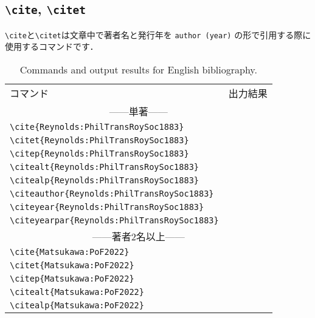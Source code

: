 \documentclass[a4paper,fleqn,12pt,uplatex]{jsarticle}
\begin{document}
\subsection*{\texttt{\textbackslash{}cite}, \texttt{\textbackslash{}citet}}
\verb|\cite|と\verb|\citet|は文章中で著者名と発行年を \verb|author (year)| の形で引用する際に使用するコマンドです．


\begin{table}[t]
    \centering
    \caption{Commands and output results for English bibliography.}
    \label{tab:English}
    \begin{tabular}{ll}
        コマンド &出力結果 \\
        \multicolumn{2}{c}{------単著------} \\
        \verb|\cite{Reynolds:PhilTransRoySoc1883}|          &\cite{Reynolds:PhilTransRoySoc1883} \\
        \verb|\citet{Reynolds:PhilTransRoySoc1883}|         &\citet{Reynolds:PhilTransRoySoc1883} \\
        \verb|\citep{Reynolds:PhilTransRoySoc1883}|         &\citep{Reynolds:PhilTransRoySoc1883} \\
        \verb|\citealt{Reynolds:PhilTransRoySoc1883}|       &\citealt{Reynolds:PhilTransRoySoc1883} \\
        \verb|\citealp{Reynolds:PhilTransRoySoc1883}|       &\citealp{Reynolds:PhilTransRoySoc1883} \\
        \verb|\citeauthor{Reynolds:PhilTransRoySoc1883}|    &\citeauthor{Reynolds:PhilTransRoySoc1883} \\
        \verb|\citeyear{Reynolds:PhilTransRoySoc1883}|      &\citeyear{Reynolds:PhilTransRoySoc1883} \\
        \verb|\citeyearpar{Reynolds:PhilTransRoySoc1883}|   &\citeyearpar{Reynolds:PhilTransRoySoc1883} \\
        \multicolumn{2}{c}{------著者2名以上------} \\
        \verb|\cite{Matsukawa:PoF2022}|         &\cite{Matsukawa:PoF2022} \\
        \verb|\citet{Matsukawa:PoF2022}|        &\citet{Matsukawa:PoF2022} \\
        \verb|\citep{Matsukawa:PoF2022}|        &\citep{Matsukawa:PoF2022} \\
        \verb|\citealt{Matsukawa:PoF2022}|      &\citealt{Matsukawa:PoF2022} \\
        \verb|\citealp{Matsukawa:PoF2022}|      &\citealp{Matsukawa:PoF2022} \\

\end{tabular}
\end{table}
\end{document}
